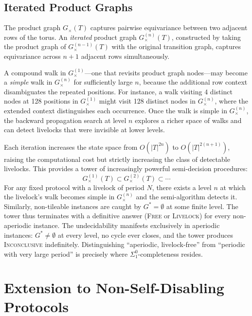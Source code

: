 \documentclass[11pt]{article}
\begin{document}
\subsection{Iterated Product Graphs}

The product graph $G_\times(T)$ captures pairwise equivariance between two adjacent rows of the torus. An \emph{iterated} product graph $G_\times^{(n)}(T)$, constructed by taking the product graph of $G_\times^{(n-1)}(T)$ with the original transition graph, captures equivariance across $n+1$ adjacent rows simultaneously.

A compound walk in $G_\times^{(1)}$---one that revisits product graph nodes---may become a \emph{simple} walk in $G_\times^{(n)}$ for sufficiently large $n$, because the additional row context disambiguates the repeated positions. For instance, a walk visiting 4 distinct nodes at 128 positions in $G_\times^{(1)}$ might visit 128 distinct nodes in $G_\times^{(n)}$, where the extended context distinguishes each occurrence. Once the walk is simple in $G_\times^{(n)}$, the backward propagation search at level $n$ explores a richer space of walks and can detect livelocks that were invisible at lower levels.

Each iteration increases the state space from $O(|T|^{2n})$ to $O(|T|^{2(n+1)})$, raising the computational cost but strictly increasing the class of detectable livelocks. This provides a tower of increasingly powerful semi-decision procedures:
\[
G_\times^{(1)}(T) \subset G_\times^{(2)}(T) \subset \cdots
\]
For any fixed protocol with a livelock of period $N$, there exists a level $n$ at which the livelock's walk becomes simple in $G_\times^{(n)}$ and the semi-algorithm detects it. Similarly, non-tileable instances are caught by $G^* = \emptyset$ at some finite level. The tower thus terminates with a definitive answer (\textsc{Free} or \textsc{Livelock}) for every non-aperiodic instance. The undecidability manifests exclusively in aperiodic instances: $G^* \neq \emptyset$ at every level, no cycle ever closes, and the tower produces \textsc{Inconclusive} indefinitely. Distinguishing ``aperiodic, livelock-free'' from ``periodic with very large period'' is precisely where $\Sigma^0_1$-completeness resides.

\section{Extension to Non-Self-Disabling Protocols}
\label{sec:non-sd}
\end{document}

